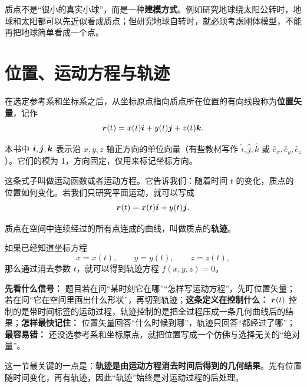 \documentclass[lang=cn,11pt]{elegantbook}
\newcommand{\bridge}[1]{\begin{note}#1\end{note}}
\begin{document}
\begin{note}
质点不是“很小的真实小球”，而是一种\textbf{建模方式}。例如研究地球绕太阳公转时，地球和太阳都可以先近似看成质点；但研究地球自转时，就必须考虑刚体模型，不能再把地球简单看成一个点。
\end{note}

\section{位置、运动方程与轨迹}

\begin{definition}[位置矢量]\label{def:position-vector}
在选定参考系和坐标系之后，从坐标原点指向质点所在位置的有向线段称为\textbf{位置矢量}，记作
\[
\vb*{r}(t)=x(t)\vb*{i}+y(t)\vb*{j}+z(t)\vb*{k}.
\]
\end{definition}

\begin{remark}
本书中 \(\vb*{i},\vb*{j},\vb*{k}\) 表示沿 \(x,y,z\) 轴正方向的单位向量（有些教材写作 \(\hat{i},\hat{j},\hat{k}\) 或 \(\hat{e}_x,\hat{e}_y,\hat{e}_z\)）。它们的模为 1，方向固定，仅用来标记坐标方向。
\end{remark}

这条式子叫做运动函数或者运动方程。它告诉我们：随着时间 \(t\) 的变化，质点的位置如何变化。若我们只研究平面运动，就可以写成
\[
\vb*{r}(t)=x(t)\vb*{i}+y(t)\vb*{j}.
\]

\begin{definition}[轨迹]\label{def:trajectory}
质点在空间中连续经过的所有点连成的曲线，叫做质点的\textbf{轨迹}。
\end{definition}

如果已经知道坐标方程
\[
x=x(t),\qquad y=y(t),\qquad z=z(t),
\]
那么通过消去参数 \(t\)，就可以得到轨迹方程 \(f(x,y,z)=0\)。

\begin{note}
\textbf{先看什么信号：} 题目若在问“某时刻它在哪”“怎样写运动方程”，先盯位置矢量；若在问“它在空间里画出什么形状”，再切到轨迹；\textbf{这条定义在控制什么：} \(\vb*{r}(t)\) 控制的是带时间标签的运动过程，轨迹控制的是把全过程压成一条几何曲线后的结果；\textbf{怎样最快记住：} 位置矢量回答“什么时候到哪”，轨迹只回答“都经过了哪”；\textbf{最容易错：} 还没选参考系和坐标原点，就把位置写成一个仿佛与选择无关的“绝对量”。
\end{note}

\bridge{这一节最关键的一点是：\textbf{轨迹是由运动方程消去时间后得到的几何结果}。先有位置随时间变化，再有轨迹，因此“轨迹”始终是对运动过程的后处理。}
\end{document}
